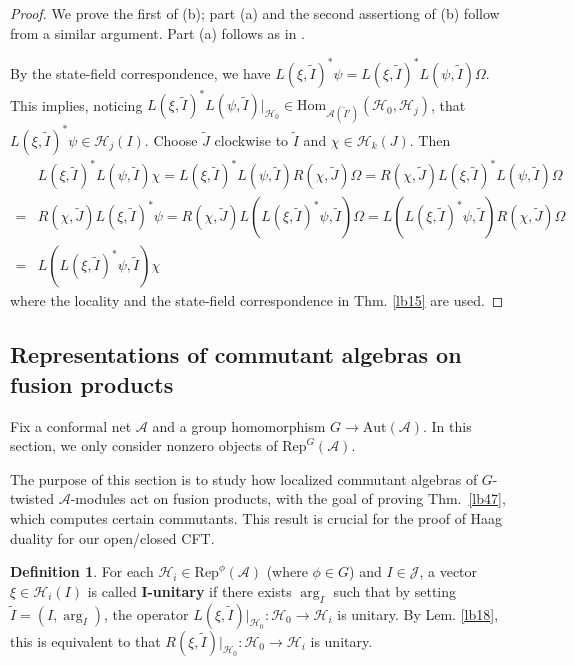\documentclass[11pt,b5paper,notitlepage]{article}
\theoremstyle{definition}
\newtheorem{df}{Definition}[section]
\theoremstyle{plain}
\newcommand{\mc}{\mathcal}
\newcommand{\wtd}{\widetilde}
\newcommand{\Hom}{\mathrm{Hom}}
\newcommand{\Rep}{\mathrm{Rep}}
\newcommand{\RepGA}{\mathrm{Rep}^G(\mathcal A)}
\newcommand{\Aut}{\mathrm{Aut}}
\newcommand{\MA}{\mathcal A}
\newcommand{\MH}{\mathcal H}
\newcommand{\MJ}{\mathcal J}
\numberwithin{equation}{section}
\begin{document}
\begin{proof}
We prove the first of (b); part (a) and the second assertiong of (b) follow from a similar argument. Part (a) follows as in \cite[Prop. 3.6]{Gui21a}.

By the state-field correspondence, we have $L(\xi,\wtd I)^*\psi=L(\xi,\wtd I)^*L(\psi,\wtd I)\Omega$. This implies, noticing $L(\xi,\wtd I)^*L(\psi,\wtd I)\big|_{\MH_0}\in\Hom_{\MA(\wtd I')}(\MH_0,\MH_j)$, that $L(\xi,\wtd I)^*\psi\in\mc H_j(I)$. Choose $\wtd J$ clockwise to $\wtd I$ and $\chi\in\mc H_k(J)$. Then
\begin{align*}
&L(\xi,\wtd I)^*L(\psi,\wtd I)\chi=L(\xi,\wtd I)^*L(\psi,\wtd I)R(\chi,\wtd J)\Omega=R(\chi,\wtd J)L(\xi,\wtd I)^*L(\psi,\wtd I)\Omega\\
=&R(\chi,\wtd J)L(\xi,\wtd I)^*\psi=R(\chi,\wtd J)L(L(\xi,\wtd I)^*\psi,\wtd I)\Omega=L(L(\xi,\wtd I)^*\psi,\wtd I)R(\chi,\wtd J)\Omega\\
=&L(L(\xi,\wtd I)^*\psi,\wtd I)\chi
\end{align*}
where the locality and the state-field correspondence in Thm. \ref{lb15} are used.
\end{proof}











\subsection{Representations of commutant algebras on fusion products}\label{lb48}


Fix a conformal net $\MA$ and a group homomorphism $G\rightarrow\Aut(\MA)$. In this section, we only consider nonzero objects of $\RepGA$. 

The purpose of this section is to study how localized commutant algebras of $G$-twisted $\MA$-modules act on fusion products, with the goal of proving Thm.~\ref{lb47}, which computes certain commutants. This result is crucial for the proof of Haag duality for our open/closed CFT.



\begin{df}
For each $\MH_i\in\Rep^\phi(\MA)$ (where $\phi\in G$) and $I\in\MJ$, a vector $\xi\in\MH_i(I)$ is called $\pmb{I}$\textbf{-unitary} if there exists $\arg_I$ such that by setting $\wtd I=(I,\arg_I)$, the operator $L(\xi,\wtd I)|_{\MH_0}:\MH_0\rightarrow\MH_i$ is unitary. By Lem. \ref{lb18}, this is equivalent to that $R(\xi,\wtd I)|_{\MH_0}:\MH_0\rightarrow\MH_i$ is unitary.
\end{df}
\end{document}
